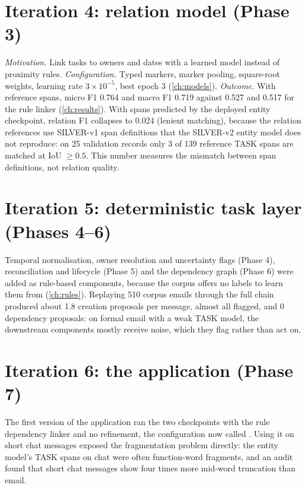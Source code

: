 \section{Iteration 4: relation model (Phase 3)}
\textit{Motivation.} Link tasks to owners and dates with a learned model instead of proximity rules.
\textit{Configuration.} Typed markers, marker pooling, square-root weights, learning rate $3\times10^{-5}$, best epoch 3 (\cref{ch:models}).
\textit{Outcome.} With reference spans, micro F1 0.764 and macro F1 0.719 against 0.527 and 0.517 for the rule linker (\cref{ch:results}). With spans predicted by the deployed entity checkpoint, relation F1 collapses to 0.024 (lenient matching), because the relation references use SILVER-v1 span definitions that the SILVER-v2 entity model does not reproduce: on 25 validation records only 3 of 139 reference TASK spans are matched at IoU $\ge 0.5$. This number measures the mismatch between span definitions, not relation quality.

\section{Iteration 5: deterministic task layer (Phases 4--6)}
Temporal normalisation, owner resolution and uncertainty flags (Phase 4), reconciliation and lifecycle (Phase 5) and the dependency graph (Phase 6) were added as rule-based components, because the corpus offers no labels to learn them from (\cref{ch:rules}). Replaying 510 corpus emails through the full chain produced about 1.8 creation proposals per message, almost all flagged, and 0 dependency proposals: on formal email with a weak TASK model, the downstream components mostly receive noise, which they flag rather than act on.

\section{Iteration 6: the application (Phase 7)}
The first version of the application ran the two checkpoints with the rule dependency linker and no refinement, the configuration now called . Using it on short chat messages exposed the fragmentation problem directly: the entity model's TASK spans on chat were often function-word fragments, and an audit found that short chat messages show four times more mid-word truncation than email.


